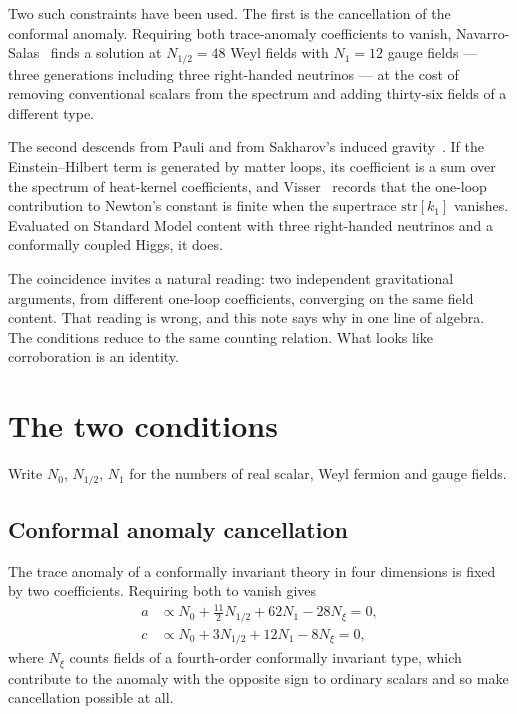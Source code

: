\documentclass[aps,prd,twocolumn,superscriptaddress,nofootinbib,10pt]{revtex4-2}
\begin{document}
Two such constraints have been used. The first is the cancellation of the conformal
anomaly. Requiring both trace-anomaly coefficients to vanish, Navarro-Salas~\cite{NavarroSalas2024}
finds a solution at $N_{1/2} = 48$ Weyl fields with $N_1 = 12$ gauge fields --- three generations
including three right-handed neutrinos --- at the cost of removing conventional scalars from the
spectrum and adding thirty-six fields of a different type.

The second descends from Pauli and from Sakharov's induced gravity~\cite{Sakharov1967}. If the
Einstein--Hilbert term is generated by matter loops, its coefficient is a sum over the spectrum of
heat-kernel coefficients, and Visser~\cite{Visser2002} records that the one-loop contribution to
Newton's constant is finite when the supertrace $\mathrm{str}[k_1]$ vanishes. Evaluated on Standard
Model content with three right-handed neutrinos and a conformally coupled Higgs, it does.

The coincidence invites a natural reading: two independent gravitational arguments, from different
one-loop coefficients, converging on the same field content. That reading is wrong, and this
note says why in one line of algebra. The conditions reduce to the same counting relation. What
looks like corroboration is an identity.

\section{The two conditions}\label{sec:conditions}

Write $N_0$, $N_{1/2}$, $N_1$ for the numbers of real scalar, Weyl fermion and gauge fields.

\subsection{Conformal anomaly cancellation}

The trace anomaly of a conformally invariant theory in four dimensions is fixed by two
coefficients. Requiring both to vanish gives~\cite{NavarroSalas2024}
%
\begin{align}
  a &\propto N_0 + \tfrac{11}{2} N_{1/2} + 62 N_1 - 28 N_\xi = 0, \label{eq:a}\\
  c &\propto N_0 + 3 N_{1/2} + 12 N_1 - 8 N_\xi = 0, \label{eq:c}
\end{align}
%
where $N_\xi$ counts fields of a fourth-order conformally invariant type, which contribute to the
anomaly with the opposite sign to ordinary scalars and so make cancellation possible at all.
\end{document}

